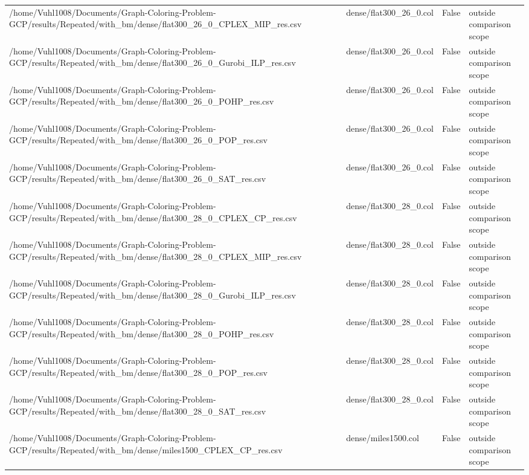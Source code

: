 \begin{table}[htbp]
\begin{tabular}{llll}
/home/Vuhl1008/Documents/Graph-Coloring-Problem-GCP/results/Repeated/with\_bm/dense/flat300\_26\_0\_CPLEX\_MIP\_res.csv & dense/flat300\_26\_0.col & False & outside comparison scope \\
/home/Vuhl1008/Documents/Graph-Coloring-Problem-GCP/results/Repeated/with\_bm/dense/flat300\_26\_0\_Gurobi\_ILP\_res.csv & dense/flat300\_26\_0.col & False & outside comparison scope \\
/home/Vuhl1008/Documents/Graph-Coloring-Problem-GCP/results/Repeated/with\_bm/dense/flat300\_26\_0\_POHP\_res.csv & dense/flat300\_26\_0.col & False & outside comparison scope \\
/home/Vuhl1008/Documents/Graph-Coloring-Problem-GCP/results/Repeated/with\_bm/dense/flat300\_26\_0\_POP\_res.csv & dense/flat300\_26\_0.col & False & outside comparison scope \\
/home/Vuhl1008/Documents/Graph-Coloring-Problem-GCP/results/Repeated/with\_bm/dense/flat300\_26\_0\_SAT\_res.csv & dense/flat300\_26\_0.col & False & outside comparison scope \\
/home/Vuhl1008/Documents/Graph-Coloring-Problem-GCP/results/Repeated/with\_bm/dense/flat300\_28\_0\_CPLEX\_CP\_res.csv & dense/flat300\_28\_0.col & False & outside comparison scope \\
/home/Vuhl1008/Documents/Graph-Coloring-Problem-GCP/results/Repeated/with\_bm/dense/flat300\_28\_0\_CPLEX\_MIP\_res.csv & dense/flat300\_28\_0.col & False & outside comparison scope \\
/home/Vuhl1008/Documents/Graph-Coloring-Problem-GCP/results/Repeated/with\_bm/dense/flat300\_28\_0\_Gurobi\_ILP\_res.csv & dense/flat300\_28\_0.col & False & outside comparison scope \\
/home/Vuhl1008/Documents/Graph-Coloring-Problem-GCP/results/Repeated/with\_bm/dense/flat300\_28\_0\_POHP\_res.csv & dense/flat300\_28\_0.col & False & outside comparison scope \\
/home/Vuhl1008/Documents/Graph-Coloring-Problem-GCP/results/Repeated/with\_bm/dense/flat300\_28\_0\_POP\_res.csv & dense/flat300\_28\_0.col & False & outside comparison scope \\
/home/Vuhl1008/Documents/Graph-Coloring-Problem-GCP/results/Repeated/with\_bm/dense/flat300\_28\_0\_SAT\_res.csv & dense/flat300\_28\_0.col & False & outside comparison scope \\
/home/Vuhl1008/Documents/Graph-Coloring-Problem-GCP/results/Repeated/with\_bm/dense/miles1500\_CPLEX\_CP\_res.csv & dense/miles1500.col & False & outside comparison scope \\

\end{tabular}
\end{table}
